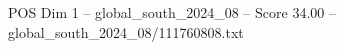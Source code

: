 \begin{textsample}{POS Dim 1 – global\_south\_2024\_08 – Score 34.00 – global\_south\_2024\_08/111760808.txt}
\end{textsample}

